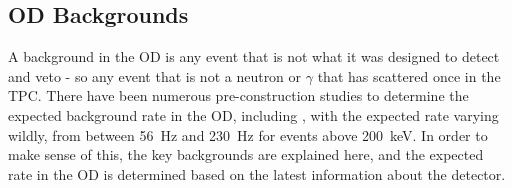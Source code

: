 \subsection{OD Backgrounds}
\label{sec:simulated_od_backgrounds}
\par
A background in the OD is any event that is not what it was designed to detect and veto - so any event that is not a neutron or $\gamma$ that has scattered once in the TPC.
There have been numerous pre-construction studies to determine the expected background rate in the OD, including \cite{LZ_TechnicalDesignReview_ref,LZ_projected_sensitivity_paper_ref,sallyshaw_thesis_ref,scotthaselschwardt_thesis_ref,lz_od_taup_2019_ref}, with the expected rate varying wildly, from between 56~Hz and 230~Hz for events above 200~keV.
In order to make sense of this, the key backgrounds are explained here, and the expected rate in the OD is determined based on the latest information about the detector.

